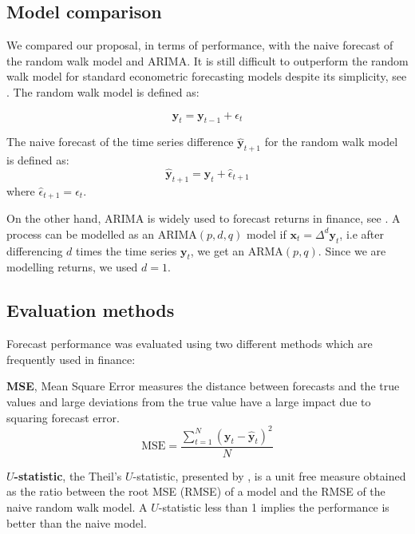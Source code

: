 \subsection{Model comparison} \label{sec:random}
We compared our proposal, in terms of performance, with the naive forecast of
the random walk model and ARIMA. It is still difficult to outperform the random
walk model for standard econometric forecasting models  despite its
simplicity, see \cite{lo2011}. The random walk model is defined as:

\begin{equation}
\mathbf{y}_t = \mathbf{y}_{t-1} + \epsilon_{t}
\label{rwmodel}
\end{equation}

The naive forecast of the time series difference $\hat{\mathbf{y}}_{t+1}$ for
the random walk model is defined as:
\begin{equation}
\hat{\mathbf{y}}_{t+1} = \mathbf{y}_t + \hat{\epsilon}_{t+1} 
\end{equation}
\noindent where  $\hat{\epsilon}_{t+1} = \epsilon_{t}$.

On the other hand, ARIMA is widely used to forecast returns in finance, see
\cite{tsay2005}. A process can be modelled as an ARIMA$(p,d,q)$ model if
$\mathbf{x}_t=\Delta^d \mathbf{y}_t $, i.e after differencing $d$ times the time
series $\mathbf{y}_t$,  we get an ARMA$(p,q)$. Since we are modelling returns,
we used $d=1$.


\subsection{Evaluation methods} \label{sec:evaluation}

Forecast performance was evaluated using two different methods which are
frequently used in finance:
\begin{description}
\item
{\bf MSE},  Mean Square Error measures the distance between forecasts
and the true values and large deviations from the true value have a
large impact due to squaring forecast error.
\begin{equation}\label{eq:MSE}
\text{MSE} = 
\frac{\displaystyle \sum_{t=1}^{N} (\mathbf{y}_t-\hat{\mathbf{y}}_t)^2}{N}
\end{equation}
\item {\bf $U$-statistic}, the Theil's $U$-statistic, presented by
\cite{theil1966}, is a unit free measure obtained as the ratio between the root
MSE (RMSE) of a model and the RMSE of the naive random walk model. A
$U$-statistic less than 1 implies the performance is better than the naive
model.
\end{description}
